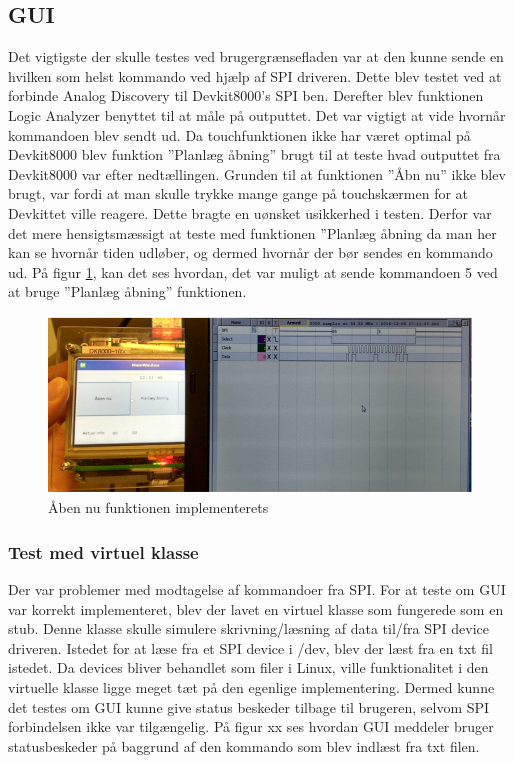 \subsection{GUI}
Det vigtigste der skulle testes ved brugergrænsefladen var at den kunne sende en hvilken som helst kommando ved hjælp af SPI driveren. Dette blev testet ved at 
forbinde Analog Discovery til Devkit8000’s SPI ben. Derefter blev funktionen Logic Analyzer benyttet til at måle på outputtet. Det var vigtigt at vide hvornår 
kommandoen blev sendt ud. Da touchfunktionen ikke har været optimal på Devkit8000 blev funktion ”Planlæg åbning” brugt til at teste hvad outputtet fra Devkit8000
 var efter nedtællingen. Grunden til at funktionen ”Åbn nu” ikke blev brugt, var fordi at man skulle trykke mange gange på touchskærmen for at Devkittet ville 
 reagere. Dette bragte en uønsket usikkerhed i testen. Derfor var det mere hensigtsmæssigt at teste med funktionen ”Planlæg åbning da man her kan se hvornår 
 tiden udløber, og dermed hvornår der bør sendes en kommando ud. På figur \ref{PAA}, kan det ses hvordan, det var muligt at sende kommandoen 5 ved at bruge 
 ”Planlæg åbning” funktionen. 

\begin{figure}[H]
	\includegraphics[scale=1]{tex/Test/GUI-Test/Billeder/test_GUI}
	\caption{Åben nu funktionen implementerets}
	\label{PAA}
\end{figure}

\subsubsection{Test med virtuel klasse}
Der var problemer med modtagelse af kommandoer fra SPI. For at teste om GUI var korrekt implementeret, blev der lavet en virtuel klasse som fungerede som en 
stub. Denne klasse skulle simulere skrivning/læsning af data til/fra SPI device driveren. Istedet for at læse fra et SPI device i /dev, blev der læst fra en txt 
fil istedet. Da devices bliver behandlet som filer i Linux, ville funktionalitet i den virtuelle klasse ligge meget tæt på den egenlige implementering. Dermed 
kunne det testes om GUI kunne give status beskeder tilbage til brugeren, selvom SPI forbindelsen ikke var tilgængelig. På figur xx ses hvordan GUI meddeler 
bruger statusbeskeder på baggrund af den kommando som blev indlæst fra txt filen.

